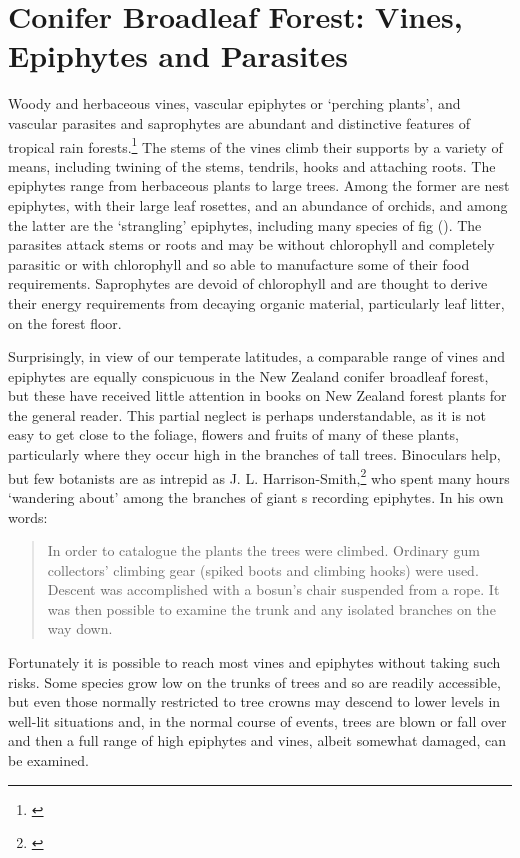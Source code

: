 \chapter{Conifer Broadleaf Forest: Vines, Epiphytes and Parasites}%
\label{ch:conifervines}

Woody and herbaceous vines, vascular epiphytes or `perching plants', and vascular parasites and saprophytes are abundant and distinctive features of tropical rain forests.\footnote{\cite{richards1952tropical}}
The stems of the vines climb their supports by a variety of means, including twining of the stems, tendrils, hooks and attaching roots.
The epiphytes range from herbaceous plants to large trees.
Among the former are nest epiphytes, with their large leaf rosettes, and an abundance of orchids, and among the latter are the `strangling' epiphytes, including many species of fig ().
The parasites attack stems or roots and may be without chlorophyll and completely parasitic or with chlorophyll and so able to manufacture some of their food requirements.
Saprophytes are devoid of chlorophyll and are thought to derive their energy requirements from decaying organic material, particularly leaf litter, on the forest floor.

Surprisingly, in view of our temperate latitudes, a comparable range of vines and epiphytes are equally conspicuous in the New Zealand conifer broadleaf forest, but these have received little attention in books on New Zealand forest plants for the general reader.
This partial neglect is perhaps understandable, as it is not easy to get close to the foliage, flowers and fruits of many of these plants, particularly where they occur high in the branches of tall trees.
Binoculars help, but few botanists are as intrepid as J. L. Harrison-Smith,\footnote{\cite{harrisonsmith1938kauri}} who spent many hours `wandering about' among the branches of giant s recording epiphytes.
In his own words:

\begin{quote}
	In order to catalogue the plants the trees were climbed.
	Ordinary gum collectors' climbing gear (spiked boots and climbing hooks) were used.
	Descent was accomplished with a bosun's chair suspended from a rope.
	It was then possible to examine the trunk and any isolated branches on the way down.
\end{quote}

Fortunately it is possible to reach most vines and epiphytes without taking such risks.
Some species grow low on the trunks of trees and so are readily accessible, but even those normally restricted to tree crowns may descend to lower levels in well-lit situations and, in the normal course of events, trees are blown or fall over and then a full range of high epiphytes and vines, albeit somewhat damaged, can be examined.

